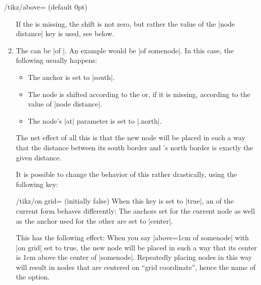 \begin{key}{/tikz/above= (default 0pt)}
\begin{enumerate}
            If the  is missing, the shift is not zero, but
            rather the value of the |node distance| key is used, see below.
        \item The  can be |of |. An example would
            be |of somenode|. In this case, the following usually happens:
            \begin{itemize}
                \item The anchor is set to |south|.
                \item The node is shifted according to the 
                    or, if it is missing, according to the value of
                    |node distance|.
                \item The node's |at| parameter is set to |.north|.
            \end{itemize}
            The net effect of all this is that the new node will be placed in
            such a way that the distance between its south border and 's north border is exactly the given distance.
\begin{codeexample}[preamble={\usetikzlibrary{positioning}}]
\end{codeexample}
            It is possible to change the behavior of this 
            rather drastically, using the following key:
            \begin{key}{/tikz/on grid= (initially false)}
                When this key is set to |true|, an  of the
                current form behaves differently: The anchors set for the
                current node as well as the anchor used for the other
                 are set to |center|.

                This has the following effect: When you say
                |above=1cm of somenode| with |on grid| set to true, the new
                node will be placed in such a way that its center is 1cm above
                the center of |somenode|. Repeatedly placing nodes in this way
                will result in nodes that are centered on ``grid coordinate'',
                hence the name of the option.
\begin{codeexample}[preamble={\usetikzlibrary{positioning}}]
\end{codeexample}
\end{key}
\end{enumerate}
\end{key}
